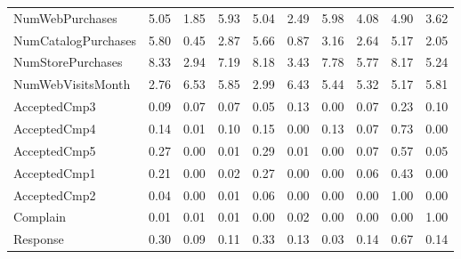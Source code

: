 \documentclass[12pt]{article}
\begin{document}
\begin{center}
\begin{adjustbox}{angle=90}
\begin{tabular}{lccccccccc}
    NumWebPurchases     &     5.05 &     1.85 &     5.93 &        5.04 &     2.49 &     5.98 &       4.08 &     4.90 &     3.62 \\
    NumCatalogPurchases &     5.80 &     0.45 &     2.87 &        5.66 &     0.87 &     3.16 &       2.64 &     5.17 &     2.05 \\
    NumStorePurchases   &     8.33 &     2.94 &     7.19 &        8.18 &     3.43 &     7.78 &       5.77 &     8.17 &     5.24 \\
    NumWebVisitsMonth   &     2.76 &     6.53 &     5.85 &        2.99 &     6.43 &     5.44 &       5.32 &     5.17 &     5.81 \\
    AcceptedCmp3        &     0.09 &     0.07 &     0.07 &        0.05 &     0.13 &     0.00 &       0.07 &     0.23 &     0.10 \\
    AcceptedCmp4        &     0.14 &     0.01 &     0.10 &        0.15 &     0.00 &     0.13 &       0.07 &     0.73 &     0.00 \\
    AcceptedCmp5        &     0.27 &     0.00 &     0.01 &        0.29 &     0.01 &     0.00 &       0.07 &     0.57 &     0.05 \\
    AcceptedCmp1        &     0.21 &     0.00 &     0.02 &        0.27 &     0.00 &     0.00 &       0.06 &     0.43 &     0.00 \\
    AcceptedCmp2        &     0.04 &     0.00 &     0.01 &        0.06 &     0.00 &     0.00 &       0.00 &     1.00 &     0.00 \\
    Complain            &     0.01 &     0.01 &     0.01 &        0.00 &     0.02 &     0.00 &       0.00 &     0.00 &     1.00 \\
    Response            &     0.30 &     0.09 &     0.11 &        0.33 &     0.13 &     0.03 &       0.14 &     0.67 &     0.14 \\
    \bottomrule
    \end{tabular}
\end{adjustbox}
\end{center}

\newpage
\end{document}
